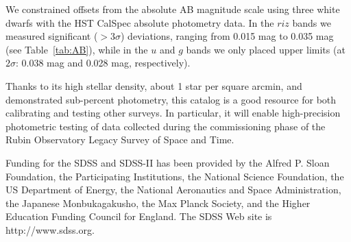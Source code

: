 \documentclass{aastex63}
\begin{document}
We constrained offsets from the absolute AB magnitude scale using three white dwarfs with the 
HST CalSpec absolute photometry data. In the $riz$ bands we measured significant ($>3\sigma$) 
deviations, ranging from 0.015 mag to 0.035 mag (see Table~\ref{tab:AB}), while in the $u$ and $g$ 
bands we only placed upper limits (at $2\sigma$: 0.038 mag and 0.028 mag, respectively).  

Thanks to its high stellar density, about 1 star per square arcmin, and demonstrated sub-percent 
photometry, this catalog is a good resource for both calibrating and testing other surveys. In
particular, it will enable high-precision photometric testing of data collected during the 
commissioning phase of the Rubin Observatory Legacy Survey of Space and Time. 
  

\acknowledgments
Funding for the SDSS and SDSS-II has been provided by the Alfred P. Sloan Foundation, the Participating
Institutions, the National Science Foundation, the US Department of Energy, the National Aeronautics and 
Space Administration, the Japanese Monbukagakusho, the Max Planck Society, and the Higher Education 
Funding Council for England. The SDSS Web site is http://www.sdss.org.
 
\vspace{5mm}


{}


%
 
\end{document}
